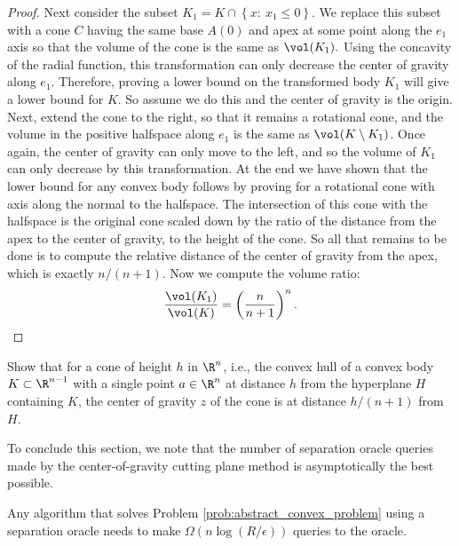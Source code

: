 \begin{proof}
Next consider the subset $K_{1}=K\cap\left\{ x:\:x_{1}\le0\right\} $.
We replace this subset with a cone $C$ having the same base $A(0)$
and apex at some point along the $e_{1}$ axis so that the volume
of the cone is the same as $\vol(K_{1}).$ Using the concavity of
the radial function, this transformation can only decrease the center
of gravity along $e_{1}$. Therefore, proving a lower bound on the
transformed body $K_{1}$ will give a lower bound for $K$. So assume
we do this and the center of gravity is the origin. Next, extend the
cone to the right, so that it remains a rotational cone, and the volume
in the positive halfspace along $e_{1}$ is the same as $\vol(K\setminus K_{1})$.
Once again, the center of gravity can only move to the left, and so
the volume of $K_{1}$ can only decrease by this transformation. At
the end we have shown that the lower bound for any convex body follows
by proving for a rotational cone with axis along the normal to the
halfspace. The intersection of this cone with the halfspace is the
original cone scaled down by the ratio of the distance from the apex
to the center of gravity, to the height of the cone. So all that remains
to be done is to compute the relative distance of the center of gravity
from the apex, which is exactly $n/(n+1)$. Now we compute the volume
ratio:
\[
\frac{\vol(K_{1})}{\vol(K)}=\left(\frac{n}{n+1}\right)^{n}.
\]
\end{proof}
\begin{xca}
Show that for a cone of height $h$ in $\R^{n}$, i.e., the convex
hull of a convex body $K\subset\R^{n-1}$ with a single point $a\in\R^{n}$
at distance $h$ from the hyperplane $H$ containing $K$, the center
of gravity $z$ of the cone is at distance $h/(n+1)$ from $H$.
\end{xca}

To conclude this section, we note that the number of separation oracle
queries made by the center-of-gravity cutting plane method is asymptotically
the best possible.
\begin{thm}
Any algorithm that solves Problem \ref{prob:abstract_convex_problem}
using a separation oracle needs to make $\Omega(n\log(R/\epsilon))$
queries to the oracle.
\end{thm}

